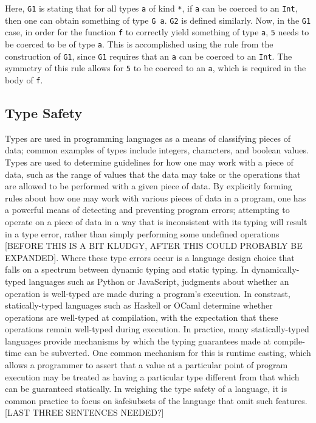 \documentclass{sig-alternate}
\begin{document}
Here, \texttt{G1} is stating that for all types \texttt{a} of kind \texttt{*}, if \texttt{a} can be coerced to an \texttt{Int}, then one can obtain something of type \texttt{G a}. \texttt{G2} is defined similarly. Now, in the \texttt{G1} case, in order for the function \texttt{f} to correctly yield something of type \texttt{a}, \texttt{5} needs to be coerced to be of type \texttt{a}. This is accomplished using the rule from the construction of \texttt{G1}, since \texttt{G1} requires that an \texttt{a} can be coerced to an \texttt{Int}. The symmetry of this rule allows for \texttt{5} to be coerced to an \texttt{a}, which is required in the body of \texttt{f}. 

\subsection{Type Safety}
\label{sec:background-type-safety}

Types are used in programming languages as a means of classifying pieces of data; common examples of types include integers, characters, and boolean values. Types are used to determine guidelines for how one may work with a piece of data, such as the range of values that the data may take or the operations that are allowed to be performed with a given piece of data. By explicitly forming rules about how one may work with various pieces of data in a program, one has a powerful means of detecting and preventing program errors; attempting to operate on a piece of data in a way that is inconsistent with its typing will result in a type error, rather than simply performing some undefined operations [BEFORE THIS IS A BIT KLUDGY, AFTER THIS COULD PROBABLY BE EXPANDED]. Where these type errors occur is a language design choice that falls on a spectrum between dynamic typing and static typing. In dynamically-typed languages such as Python or JavaScript, judgments about whether an operation is well-typed are made during a program's execution. In constrast, statically-typed languages such as Haskell or OCaml determine whether operations are well-typed at compilation, with the expectation that these operations remain well-typed during execution. In practice, many statically-typed languages provide mechanisms by which the typing guarantees made at compile-time can be subverted. One common mechanism for this is runtime casting, which allows a programmer to assert that a value at a particular point of program execution may be treated as having a particular type different from that which can be guaranteed statically. In weighing the type safety of a language, it is common practice to focus on \"safe\" subsets of the language that omit such features. [LAST THREE SENTENCES NEEDED?]
\end{document}
